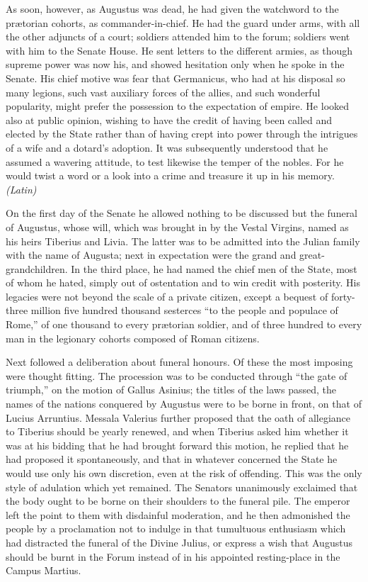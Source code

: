 As soon, however, as Augustus was dead, he had given the watchword to the prætorian cohorts, as commander-in-chief. He had the guard under arms, with all the other adjuncts of a court; soldiers attended him to the forum; soldiers went with him to the Senate House. He sent letters to the different armies, as though supreme power was now his, and showed hesitation only when he spoke in the Senate. His chief motive was fear that Germanicus, who had at his disposal so many legions, such vast auxiliary forces of the allies, and such wonderful popularity, might prefer the possession to the expectation of empire. He looked also at public opinion, wishing to have the credit of having been called and elected by the State rather than of having crept into power through the intrigues of a wife and a dotard's adoption. It was subsequently understood that he assumed a wavering attitude, to test likewise the temper of the nobles. For he would twist a word or a look into a crime and treasure it up in his memory. \emph{(Latin)}


On the first day of the Senate he allowed nothing to be discussed but the funeral of Augustus, whose will, which was brought in by the Vestal Virgins, named as his heirs Tiberius and Livia. The latter was to be admitted into the Julian family with the name of Augusta; next in expectation were the grand and great-grandchildren. In the third place, he had named the chief men of the State, most of whom he hated, simply out of ostentation and to win credit with posterity. His legacies were not beyond the scale of a private citizen, except a bequest of forty-three million five hundred thousand sesterces ``to the people and populace of Rome,'' of one thousand to every prætorian soldier, and of three hundred to every man in the legionary cohorts composed of Roman citizens.

Next followed a deliberation about funeral honours. Of these the most imposing were thought fitting. The procession was to be conducted through ``the gate of triumph,'' on the motion of Gallus Asinius; the titles of the laws passed, the names of the nations conquered by Augustus were to be borne in front, on that of Lucius Arruntius. Messala Valerius further proposed that the oath of allegiance to Tiberius should be yearly renewed, and when Tiberius asked him whether it was at his bidding that he had brought forward this motion, he replied that he had proposed it spontaneously, and that in whatever concerned the State he would use only his own discretion, even at the risk of offending. This was the only style of adulation which yet remained. The Senators unanimously exclaimed that the body ought to be borne on their shoulders to the funeral pile. The emperor left the point to them with disdainful moderation, and he then admonished the people by a proclamation not to indulge in that tumultuous enthusiasm which had distracted the funeral of the Divine Julius, or express a wish that Augustus should be burnt in the Forum instead of in his appointed resting-place in the Campus Martius.

